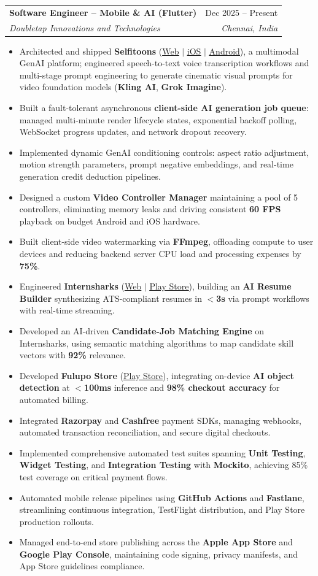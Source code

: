 \documentclass[letterpaper,10pt]{article}
\makeatletter
\newcommand{\resumeItem}[1]{
  \item\small{
    {#1 \vspace{-2pt}}
  }
}
\newcommand{\resumeSubheading}[4]{
  \vspace{-2pt}\item
    \begin{tabular*}{0.97\textwidth}[t]{l@{\extracolsep{\fill}}r}
      \textbf{#1} & #2 \\
      \textit{\small#3} & \textit{\small #4} \\
    \end{tabular*}\vspace{-5pt}
}
\newcommand{\resumeItemListStart}{\begin{itemize}[leftmargin=0.15in]}
\newcommand{\resumeItemListEnd}{\end{itemize}\vspace{-4pt}}
\makeatother
\begin{document}
    \resumeSubheading
      {Software Engineer -- Mobile \& AI (Flutter)}{Dec 2025 -- Present}
      {Doubletap Innovations and Technologies}{Chennai, India}
      \resumeItemListStart
        \resumeItem{Architected and shipped \textbf{Selfitoons} (\href{https://selfitoons.ai/}{\underline{Web}} $|$ \href{https://apps.apple.com/in/app/selfitoons/id6758597947}{\underline{iOS}} $|$ \href{https://play.google.com/store/apps/details?id=com.doubletap.ai.selfitoons}{\underline{Android}}), a multimodal GenAI platform; engineered speech-to-text voice transcription workflows and multi-stage prompt engineering to generate cinematic visual prompts for video foundation models (\textbf{Kling AI}, \textbf{Grok Imagine}).}
        \resumeItem{Built a fault-tolerant asynchronous \textbf{client-side AI generation job queue}: managed multi-minute render lifecycle states, exponential backoff polling, WebSocket progress updates, and network dropout recovery.}
        \resumeItem{Implemented dynamic GenAI conditioning controls: aspect ratio adjustment, motion strength parameters, prompt negative embeddings, and real-time generation credit deduction pipelines.}
        \resumeItem{Designed a custom \textbf{Video Controller Manager} maintaining a pool of 5 controllers, eliminating memory leaks and driving consistent \textbf{60 FPS} playback on budget Android and iOS hardware.}
        \resumeItem{Built client-side video watermarking via \textbf{FFmpeg}, offloading compute to user devices and reducing backend server CPU load and processing expenses by \textbf{75\%}.}
        \resumeItem{Engineered \textbf{Internsharks} (\href{https://internsharks.ai/}{\underline{Web}} $|$ \href{https://play.google.com/store/apps/details?id=com.doubletap.internsharks.ai}{\underline{Play Store}}), building an \textbf{AI Resume Builder} synthesizing ATS-compliant resumes in \textbf{$<$3s} via prompt workflows with real-time streaming.}
        \resumeItem{Developed an AI-driven \textbf{Candidate-Job Matching Engine} on Internsharks, using semantic matching algorithms to map candidate skill vectors with \textbf{92\%} relevance.}
        \resumeItem{Developed \textbf{Fulupo Store} (\href{https://play.google.com/store/apps/details?id=com.doubletap.fulupostore}{\underline{Play Store}}), integrating on-device \textbf{AI object detection} at \textbf{$<$100ms} inference and \textbf{98\% checkout accuracy} for automated billing.}
        \resumeItem{Integrated \textbf{Razorpay} and \textbf{Cashfree} payment SDKs, managing webhooks, automated transaction reconciliation, and secure digital checkouts.}
        \resumeItem{Implemented comprehensive automated test suites spanning \textbf{Unit Testing}, \textbf{Widget Testing}, and \textbf{Integration Testing} with \textbf{Mockito}, achieving 85\% test coverage on critical payment flows.}
        \resumeItem{Automated mobile release pipelines using \textbf{GitHub Actions} and \textbf{Fastlane}, streamlining continuous integration, TestFlight distribution, and Play Store production rollouts.}
        \resumeItem{Managed end-to-end store publishing across the \textbf{Apple App Store} and \textbf{Google Play Console}, maintaining code signing, privacy manifests, and App Store guidelines compliance.}
      \resumeItemListEnd
\end{document}
